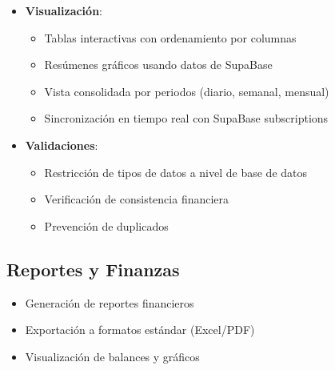 \begin{itemize}
    \item \textbf{Visualización}:
    \begin{itemize}
        \item Tablas interactivas con ordenamiento por columnas
        \item Resúmenes gráficos usando datos de SupaBase
        \item Vista consolidada por periodos (diario, semanal, mensual)
        \item Sincronización en tiempo real con SupaBase subscriptions
    \end{itemize}
    
    \item \textbf{Validaciones}:
    \begin{itemize}
        \item Restricción de tipos de datos a nivel de base de datos
        \item Verificación de consistencia financiera
        \item Prevención de duplicados
    \end{itemize}
\end{itemize}

\subsection{Reportes y Finanzas}
\begin{itemize}
    \item Generación de reportes financieros
    \item Exportación a formatos estándar (Excel/PDF)
    \item Visualización de balances y gráficos
\end{itemize}

